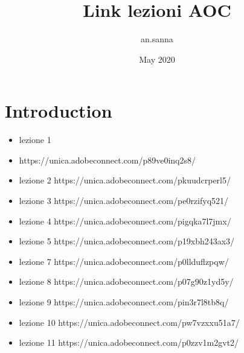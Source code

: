 \documentclass{article}
\title{Link lezioni AOC}
\author{an.sanna }
\date{May 2020}
\begin{document}
\maketitle

\section{Introduction}
\begin{itemize}
\item lezione 1 \item https://unica.adobeconnect.com/p89ve0inq2s8/\\
\item lezione 2 https://unica.adobeconnect.com/pkuudcrperl5/\\
\item lezione 3 https://unica.adobeconnect.com/pe0rzifyq521/\\
\item lezione 4 https://unica.adobeconnect.com/pigqka7l7jmx/\\
\item lezione 5 https://unica.adobeconnect.com/p19xbh243ax3/\\
\item lezione 7 https://unica.adobeconnect.com/p0llduflzpqw/\\
\item lezione 8 https://unica.adobeconnect.com/p07g90z1yd5y/\\
\item lezione 9 https://unica.adobeconnect.com/pin3r7l8tb8q/\\
\item lezione 10 https://unica.adobeconnect.com/pw7vzxxu51a7/\\
\item lezione 11 https://unica.adobeconnect.com/p0zzv1m2gvt2/\\
\end{itemize}
\end{document}
